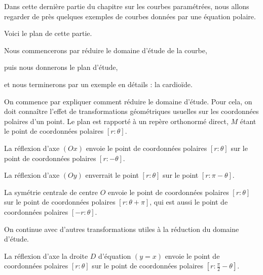 






\debuttexte


\diapo


Dans cette dernière partie du chapitre sur les courbes paramétrées, 
nous allons regarder de près quelques exemples 
de courbes données par une équation polaire.

\change

Voici le plan de cette partie.

\change

Nous commencerons par réduire le domaine d'étude de la courbe,

\change 
puis nous donnerons le plan d'étude,

\change 
et nous terminerons par un exemple en détails : la cardioïde.

\diapo

On commence par expliquer comment réduire le domaine d'étude. 
Pour cela, on doit connaître l'effet de transformations géométriques 
usuelles sur les coordonnées polaires d'un point.  
Le plan est rapporté à un repère orthonormé direct, $M$ étant le point de coordonnées polaires $[r:\theta]$.

La réflexion d'axe $(Ox)$ envoie le point de coordonnées polaires 
$[r:\theta]$ sur le point de coordonnées polaires $[r:-\theta]$.
 
\change


La réflexion d'axe $(Oy)$ enverrait le point $[r:\theta]$ 
sur le point $[r:\pi -\theta]$.
 
\change


La symétrie centrale de centre $O$ envoie le point de 
coordonnées polaires $[r:\theta]$  sur le point de 
coordonnées polaires $[r:\theta+\pi]$, qui est aussi le point de coordonnées polaires $[-r:\theta]$.



\diapo


On continue avec d'autres transformations utiles à la réduction du domaine d'étude.

La réflexion d'axe la droite $D$ d'équation $(y=x)$ envoie 
le point de coordonnées polaires $[r:\theta]$ sur le point de coordonnées polaires $[r:\frac{\pi}{2}-\theta]$.
 
